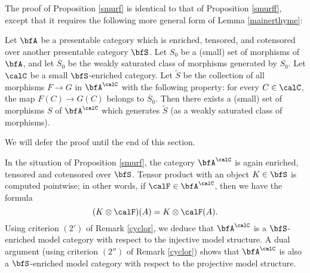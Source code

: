 The proof of Proposition \ref{smurf} is identical to that of Proposition \ref{smurff}, 
except that it requires the following more general form of Lemma \ref{mainerthyme}:

\begin{lemma}\label{mainertime}
Let $\bfA$ be a presentable category which is enriched, tensored, and cotensored over another presentable category $\bfS$. Let $S_0$ be a (small) set of morphisms of $\bfA$, and let $\overline{S}_0$ be the weakly saturated class of morphisms generated by $S_0$. Let $\calC$ be a small $\bfS$-enriched category. Let $\widetilde{S}$ be the collection of all morphisms $F \rightarrow G$ in $\bfA^{\calC}$ with the following property: for every $C \in \calC$, the map $F(C) \rightarrow G(C)$ belongs to $\overline{S}_0$. Then there exists a (small) set of morphisms $S$ of $\bfA^{\calC}$ which generates $\widetilde{S}$ (as a weakly saturated class of morphisms).
\end{lemma}

We will defer the proof until the end of this section.

\begin{remark}\label{suboteki}
In the situation of Proposition \ref{smurf}, the category $\bfA^{\calC}$ is again
enriched, tensored and cotensored over $\bfS$. Tensor product with an object $K \in \bfS$ is computed pointwise; in other words, if $\calF \in \bfA^{\calC}$, then we have the formula $$ (K \otimes \calF)(A) = K \otimes \calF(A).$$
Using criterion $(2')$ of Remark \ref{cyclor}, we deduce that $\bfA^{\calC}$ is a $\bfS$-enriched model category with respect to the injective model structure. A dual argument (using criterion $(2'')$ of Remark \ref{cyclor}) shows that $\bfA^{\calC}$ is also a $\bfS$-enriched model category with respect to the projective model structure.
\end{remark}

